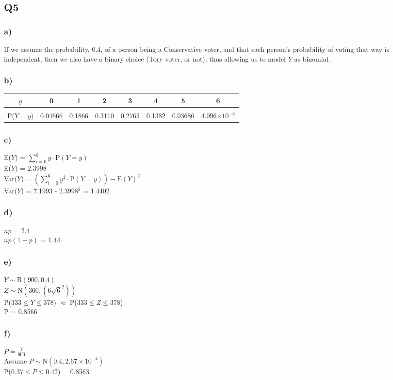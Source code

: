 \documentclass[]{article}
\begin{document}
\subsection{Q5}
\subsubsection{a)}
If we assume the probability, 0.4, of a person being a Conservative voter, and that each person's probability of voting that way is independent, then we also have a binary choice (Tory voter, or not), thus allowing us to model $Y$ as binomial.
\subsubsection{b)}
\begin{tabular}{c|c|c|c|c|c|c|c}
    $y$&0&1&2&3&4&5&6\\
    \hline
    \\[\dimexpr-\normalbaselineskip+4pt]
    P($Y=y$)&0.04666&0.1866&0.3110&0.2765&0.1382&0.03686&4.096$\times10^{-3}$
\end{tabular}
\subsubsection{c)}
E($Y$) = $\sum_{i=0}^{6} y \cdot \textrm{P}(Y=y)$
\\
E($Y$) = 2.3998 
\\
Var($Y$) = $\left(\sum_{i=0}^{6} y^2 \cdot \textrm{P}(Y=y)\right) - \textrm{E}(Y)^2$
\\
Var($Y$) = 7.1993 - 2.3998$^2$ = 1.4402
\subsubsection{d)}
$np$ = 2.4
\\
$np(1-p)$ = 1.44
\subsubsection{e)}
$Y \sim \textrm{B}(900,0.4)$
\\
$Z \sim \textrm{N}(360,(6\sqrt{6}^2))$
\\
P($333 \leq Y \leq 378$) $\approx$ P($333 \leq Z \leq 378$)
\\
P = 0.8566
\subsubsection{f)}
$P = \frac{Y}{900}$
\\
Assume $P \sim \textrm{N}(0.4, 2.67\times 10^{-4})$
\\
P($0.37 \leq P \leq 0.42$) = 0.8563
\end{document}
